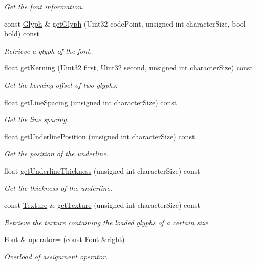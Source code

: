 \begin{DoxyCompactItemize}
\begin{DoxyCompactList}\small\item\em Get the font information. \end{DoxyCompactList}\item 
const \hyperlink{classsf_1_1Glyph}{Glyph} \& \hyperlink{classsf_1_1Font_aed075b0dbb9d23477858e64d20ba0c2b}{get\+Glyph} (Uint32 code\+Point, unsigned int character\+Size, bool bold) const
\begin{DoxyCompactList}\small\item\em Retrieve a glyph of the font. \end{DoxyCompactList}\item 
float \hyperlink{classsf_1_1Font_a5e1d5aca772d4765ce940670c2f786a6}{get\+Kerning} (Uint32 first, Uint32 second, unsigned int character\+Size) const
\begin{DoxyCompactList}\small\item\em Get the kerning offset of two glyphs. \end{DoxyCompactList}\item 
float \hyperlink{classsf_1_1Font_a4538cc8af337393208a87675fe1c3e59}{get\+Line\+Spacing} (unsigned int character\+Size) const
\begin{DoxyCompactList}\small\item\em Get the line spacing. \end{DoxyCompactList}\item 
float \hyperlink{classsf_1_1Font_a726a55f40c19ac108e348b103190caad}{get\+Underline\+Position} (unsigned int character\+Size) const
\begin{DoxyCompactList}\small\item\em Get the position of the underline. \end{DoxyCompactList}\item 
float \hyperlink{classsf_1_1Font_ad6d0a5bc6c026fe85c239f1f822b54e6}{get\+Underline\+Thickness} (unsigned int character\+Size) const
\begin{DoxyCompactList}\small\item\em Get the thickness of the underline. \end{DoxyCompactList}\item 
const \hyperlink{classsf_1_1Texture}{Texture} \& \hyperlink{classsf_1_1Font_a15528d289f91cfd4b2597f8a9423e612}{get\+Texture} (unsigned int character\+Size) const
\begin{DoxyCompactList}\small\item\em Retrieve the texture containing the loaded glyphs of a certain size. \end{DoxyCompactList}\item 
\hyperlink{classsf_1_1Font}{Font} \& \hyperlink{classsf_1_1Font_a232515549846e3172a514d0b47918399}{operator=} (const \hyperlink{classsf_1_1Font}{Font} \&right)
\begin{DoxyCompactList}\small\item\em Overload of assignment operator. \end{DoxyCompactList}\end{DoxyCompactItemize}



